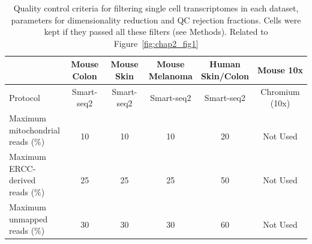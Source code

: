 \begin{table}[htp!]
\footnotesize
\caption[Quality control criteria for filtering scRNA-seq]{Quality control criteria for filtering single cell transcriptomes in each dataset, parameters for dimensionality reduction and QC rejection fractions. Cells were kept if they passed all these filters (see Methods). Related to Figure~\ref{fig:chap2_fig1}}
\centering
\label{table:tab_A_1}
\begin{tabular}{l|c c c c c}
\hline 
  & \specialcell[t]{Mouse\\Colon} & \specialcell[t]{Mouse\\Skin} & \specialcell[t]{Mouse\\Melanoma} & \specialcell[t]{Human\\Skin/Colon} & Mouse 10x\\
\hline
Protocol & Smart-seq2 & Smart-seq2 & Smart-seq2 & Smart-seq2 & Chromium (10x)\\

\specialcell[t]{Maximum\\mitochondrial\\reads (\%)} & \specialcell[t]{ \\10\\ } & \specialcell[t]{ \\10\\ } & \specialcell[t]{ \\10\\ } & \specialcell[t]{ \\20\\ } & \specialcell[t]{ \\Not Used\\ }\\

\specialcell[t]{Maximum\\ERCC-derived\\reads (\%)} & \specialcell[t]{ \\25\\ } & \specialcell[t]{ \\25\\ } & \specialcell[t]{ \\25\\ } & \specialcell[t]{ \\50\\ } & \specialcell[t]{ \\Not Used\\ }\\

\specialcell[t]{Maximum\\unmapped\\reads (\%)} & \specialcell[t]{ \\30\\ } & \specialcell[t]{ \\30\\ } & \specialcell[t]{ \\30\\ } & \specialcell[t]{ \\60\\ } & \specialcell[t]{ \\Not Used\\ }\\


\end{tabular}
\end{table}
